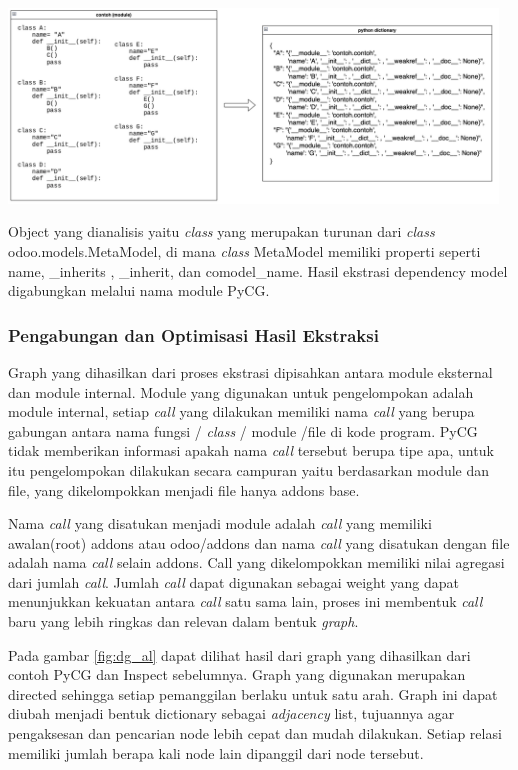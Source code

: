 \begin{center}
	\includegraphics[width=13cm]{img/bab_3/inspectSample.png}
	\label{contoh_inspectSample}
\end{center}

Object yang dianalisis yaitu \textit{class} yang merupakan turunan dari \textit{class} odoo.models.MetaModel, di mana \textit{class} MetaModel memiliki properti seperti  name, \_inherits , \_inherit, dan comodel\_name. Hasil ekstrasi dependency model digabungkan melalui nama module PyCG.

\subsubsection{Pengabungan dan Optimisasi Hasil Ekstraksi}
Graph yang dihasilkan dari proses ekstrasi dipisahkan antara module eksternal dan module internal. Module yang digunakan untuk pengelompokan adalah module internal, setiap \textit{call} yang dilakukan memiliki nama \textit{call} yang berupa gabungan antara nama fungsi / \textit{class} / module /file di kode program. PyCG tidak memberikan informasi apakah nama \textit{call} tersebut berupa tipe apa, untuk itu pengelompokan dilakukan secara campuran yaitu berdasarkan module dan file, yang dikelompokkan menjadi file hanya addons base.

Nama \textit{call} yang disatukan menjadi module adalah \textit{call} yang memiliki awalan(root) addons atau odoo/addons dan nama \textit{call} yang disatukan dengan file adalah nama \textit{call} selain addons. Call yang dikelompokkan memiliki nilai agregasi dari jumlah \textit{call}. Jumlah \textit{call} dapat digunakan sebagai weight yang dapat menunjukkan kekuatan antara \textit{call} satu sama lain, proses ini membentuk \textit{call} baru yang lebih ringkas dan relevan dalam bentuk \textit{graph}. 

Pada gambar \ref{fig:dg_al} dapat dilihat hasil dari graph yang dihasilkan dari contoh PyCG dan Inspect sebelumnya. Graph yang digunakan merupakan directed sehingga setiap pemanggilan berlaku untuk satu arah. Graph ini dapat diubah menjadi bentuk dictionary sebagai \textit{adjacency} list, tujuannya agar pengaksesan dan pencarian node lebih cepat dan mudah dilakukan. Setiap relasi memiliki jumlah berapa kali node lain dipanggil dari node tersebut.

